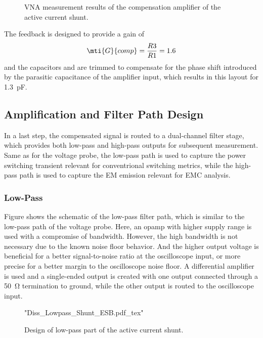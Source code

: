 \begin{figure}[ht]
	\centering
	
	\caption{VNA measurement results of the compensation amplifier of the active current shunt.}\label{fig:VNA_AShunt_comp_S}
\end{figure}

The feedback is designed to provide a gain of
\begin{equation}
	\mti{G}{comp} = \frac{R3}{R1} = 1.6
\end{equation}
and the capacitors  and  are trimmed to compensate for the phase shift introduced by the parasitic capacitance of the amplifier input, which results in this layout for \SI{1.3}{pF}.


\subsection{Amplification and Filter Path Design}
In a last step, the compensated signal is routed to a dual-channel filter stage, which provides both low-pass and high-pass outputs for subsequent measurement.
Same as for the voltage probe, the low-pass path is used to capture the power switching transient relevant for conventrional switching metrics, while the high-pass path is used to capture the EM emission relevant for EMC analysis.

\subsubsection*{Low-Pass}

Figure  shows the schematic of the low-pass filter path, which is similar to the low-pass path of the voltage probe.
Here, an opamp with higher supply range is used with a compromise of bandwidth.
However, the high bandwidth is not necessary due to the known noise floor behavior.
And the higher output voltage is beneficial for a better signal-to-noise ratio at the oscilloscope input, or more precise for a better margin to the oscilloscope noise floor.
A differential amplifier is used and a single-ended output is created with one output connected through a \SI{50}{\ohm} termination to ground, while the other output is routed to the oscilloscope input.

\begin{figure}[ht]
	\centering
	{"Diss_Lowpass_Shunt_ESB.pdf_tex"}
	\caption{Design of low-pass part of the active current shunt.}\label{fig:ESBLowpass}
\end{figure}

